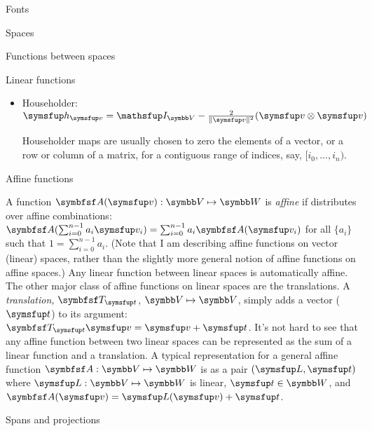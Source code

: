 \documentclass[12pt]{PalisadesLakesArticle}
\begin{document}
\begin{plSection}{Fonts}
\begin{plSection}{Spaces}
\begin{plSection}{Functions between spaces}
\begin{plSection}{Linear functions}
\begin{itemize}
$\Vector{r}_i^{\Vector{L}} \in \Space{V}$ are the 'rows' of $\Vector{L}$.
$\linearspan\{ \Vector{r}_0^{\Vector{L}} \ldots \Vector{r}_{m-1}^{\Vector{L}} \} =  \kernel(\Vector{L})^{\perp}$
(see \cref{sec:spans-and-projections}).

\item Householder:
$\Vector{h}_{\Vector{v}} 
= \Identity_{\Space{V}} - \frac{2}{\| \Vector{v} \|^2} 
(\Vector{v} \otimes \Vector{v})$

Householder maps are usually chosen to zero the elements of
a vector, or a row or column of a matrix, for a contiguous range of
indices, say, $[i_0,\ldots,i_n)$.

\end {itemize}

\end{plSection}%
\begin{plSection}{Affine functions}
\label{sec:affine-functions}

A function $\Point{A}(\Vector{v}):\Space{V} \mapsto \Space{W}$
is \textit{affine} if distributes over affine combinations:
$\Point{A}(\sum_{i=0}^{n-1} 
a_i \Vector{v}_i) = \sum_{i=0}^{n-1} a_i \Point{A}(\Vector{v}_i) $
for all $\{a_i\}$ such that $1 = \sum_{i=0}^{n-1} a_i$.
(Note that I am describing affine functions on vector (linear) spaces,
rather than the slightly more general notion of affine functions on affine spaces.)
Any linear function between linear spaces is automatically affine.
The other major class of affine functions on linear spaces are the translations.
A \textit{translation,} $\Point{T}_{\Vector{t}}$, $\Space{V} \mapsto \Space{V}$,
simply adds a vector ($\Vector{t}$) to its argument:
$\Point{T}_{\Vector{t}} \Vector{v} = \Vector{v} + \Vector{t}$.
It's not hard to see that any affine function between two linear spaces
can be represented as the sum of a linear function and a translation.
A typical representation for a general affine function 
$\Point{A} : \Space{V} \mapsto \Space{W}$
is as a pair $(\Vector{L},\Vector{t})$ where $
\Vector{L} : \Space{V} \mapsto \Space{W}$ is linear,
$\Vector{t} \in \Space{W}$, and 
$\Point{A}(\Vector{v}) = \Vector{L}(\Vector{v}) + \Vector{t}$.

\end{plSection}%
\begin{plSection}{Spans and projections}
\label{sec:spans-and-projections}


\end{plSection}
\end{plSection}
\end{plSection}
\end{plSection}
\end{document}
